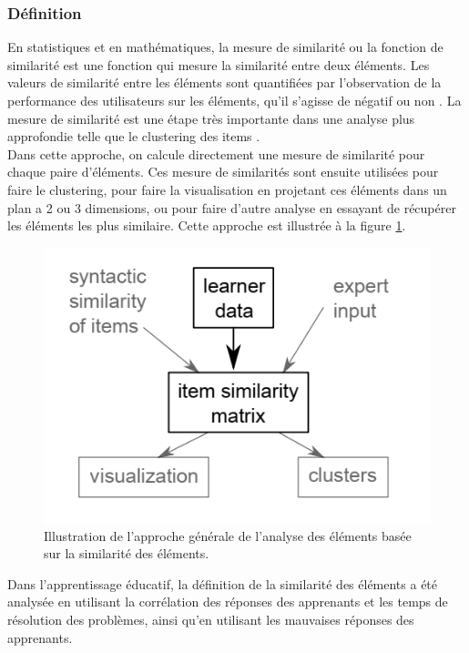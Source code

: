 \subsubsection{Définition}
En statistiques et en mathématiques, la mesure de similarité ou la fonction de similarité est une fonction qui mesure la similarité entre deux éléments. Les valeurs de similarité entre les éléments sont quantifiées par l'observation de la performance des utilisateurs sur les éléments, qu'il s'agisse de négatif ou non \cite{nithya2017calculating}. La mesure de similarité est une étape très importante dans une analyse plus approfondie telle que le clustering des items \cite{pelanek2018measuring}.  \\
Dans cette approche, on calcule directement une mesure de similarité pour chaque paire d'éléments. Ces mesure de similarités sont ensuite utilisées pour faire le clustering, pour faire la visualisation en projetant ces éléments dans un plan a 2 ou 3 dimensions, ou pour faire d’autre analyse en essayant de récupérer les éléments les plus similaire. Cette approche est illustrée à la figure \ref{illustration_item_similarity}. 

\begin{figure}[H]
	\begin{center}
		\includegraphics[scale=0.8]{images/chapitre3/Illustration_item_smilarity.png}
	\end{center}
\caption{Illustration de l'approche générale de l'analyse des éléments basée sur la similarité des éléments.}
\label{illustration_item_similarity}
\end{figure}

Dans l'apprentissage éducatif, la définition de la similarité des éléments a été analysée en utilisant la corrélation des réponses des apprenants et les temps de résolution des problèmes, ainsi qu'en utilisant les mauvaises réponses des apprenants. \cite{pelanek2018measuring}

